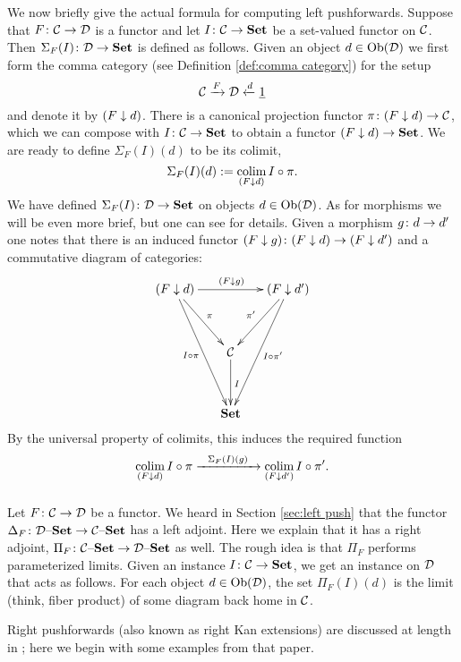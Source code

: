 \documentclass[CT4S-EN-RU]{subfiles}
\begin{document}
We now briefly give the actual formula for computing left pushforwards. Suppose that $F\colon\mathcal{C}\rightarrow\mathcal{D}$ is a functor and let $I\colon\mathcal{C}\rightarrow{\bf Set}$ be a set-valued functor on $\mathcal{C}$. Then $\Sigma_F(I)\colon\mathcal{D}\rightarrow{\bf Set}$ is defined as follows. Given an object $d\in\textnormal{Ob}(\mathcal{D})$ we first form the comma category (see Definition \ref{def:comma category}) for the setup
$$\mathcal{C}\xrightarrow{F}\mathcal{D}\xleftarrow{d}\underline{1}$$
and denote it by $(F\downarrow d)$. There is a canonical projection functor $\pi\colon(F\downarrow d)\rightarrow\mathcal{C}$, which we can compose with $I\colon\mathcal{C}\rightarrow{\bf Set}$ to obtain a functor $(F\downarrow d)\rightarrow{\bf Set}$. We are ready to define $\Sigma_F(I)(d)$ to be its colimit,
$$\Sigma_F(I)(d):=\mathop{\textnormal{colim}}_{(F\downarrow d)}I\circ\pi.$$
We have defined $\Sigma_F(I)\colon\mathcal{D}\rightarrow{\bf Set}$ on objects $d\in\textnormal{Ob}(\mathcal{D})$. As for morphisms we will be even more brief, but one can see \cite{Sp1} for details. Given a morphism $g\colon d\rightarrow d'$ one notes that there is an induced functor $(F\downarrow g)\colon (F\downarrow d)\rightarrow(F\downarrow d')$ and a commutative diagram of categories:
$$
\xymatrix@=15pt{
(F\down d)\ar[rr]^{(F\down g)}\ar[ddr]^{\pi}\ar[ddddr]_{I\circ\pi}&&(F\down d')\ar[ddl]_{\pi'}\ar[ddddl]^{I\circ\pi'}\\\\
&\mcC\ar[dd]^I\\\\
&\Set
}
$$
By the universal property of colimits, this induces the required function $$\mathop{\textnormal{colim}}_{(F\downarrow d)}I\circ\pi\xrightarrow{\ \ \Sigma_F(I)(g)\ \ }\mathop{\textnormal{colim}}_{(F\downarrow d')}I\circ\pi'.$$


\subsubsection{}

Let $F\colon\mathcal{C}\rightarrow\mathcal{D}$ be a functor. We heard in Section \ref{sec:left push} that the functor $\Delta_F\colon\mathcal{D}{\text \textendash}{\bf Set}\rightarrow\mathcal{C}{\text \textendash}{\bf Set}$ has a left adjoint. Here we explain that it has a right adjoint, $\Pi_F\colon\mathcal{C}{\text \textendash}{\bf Set}\rightarrow\mathcal{D}{\text \textendash}{\bf Set}$ as well. The rough idea is that $\Pi_F$ performs parameterized limits. Given an instance $I\colon\mathcal{C}\rightarrow{\bf Set}$, we get an instance on $\mathcal{D}$ that acts as follows. For each object $d\in\textnormal{Ob}(\mathcal{D})$, the set $\Pi_F(I)(d)$ is the limit (think, fiber product) of some diagram back home in $\mathcal{C}$. 

Right pushforwards (also known as right Kan extensions) are discussed at length in \cite{Sp1}; here we begin with some examples from that paper.
\end{document}
